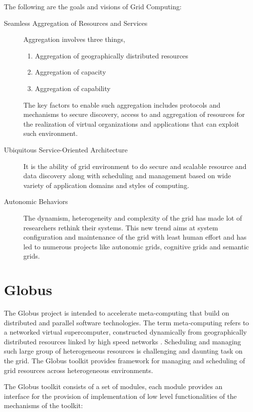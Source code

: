 \documentclass[ms,electronic,double]{nuthesis}
\begin{document}
The following are the goals and visions of Grid Computing:


\begin{description}
  \item[Seamless Aggregation of Resources and Services]
  Aggregation involves three things, 
  \begin{enumerate}
    \item{Aggregation of geographically distributed resources}
    \item{Aggregation of capacity}
    \item{Aggregation of capability}
      \end{enumerate}
    The key factors to enable such aggregation includes protocols and mechanisms 
    to secure discovery, access to and aggregation of resources for the 
    realization of virtual organizations and applications that can exploit such 
    environment.

  \item[Ubiquitous Service-Oriented Architecture] It is the ability of grid 
  environment to do secure and scalable resource and data discovery along with scheduling and 
  management based on wide variety of application domains and styles of 
  computing.
  
  \item[Autonomic Behaviors]
  The dynamism, heterogeneity and complexity of the grid has made lot of 
  researchers rethink their systems. This new trend aims at system configuration 
  and maintenance of the grid with least human effort and has led to numerous 
  projects like autonomic grids, cognitive grids and semantic grids.
  
\end{description}

\section{Globus}
The Globus project is intended to accelerate meta-computing that build on 
distributed and parallel software technologies. The term meta-computing refers to 
a networked virtual supercomputer, constructed dynamically from geographically 
distributed resources linked by high speed networks \cite{globus}. Scheduling 
and managing such large group of heterogeneous resources is challenging and 
daunting task on the grid. The Globus toolkit provides framework for managing 
and scheduling of grid resources across heterogeneous environments.

The Globus toolkit consists of a set of modules,  each module provides an 
interface for the provision of implementation of low level functionalities of 
the mechanisms of the toolkit:
\end{document}
